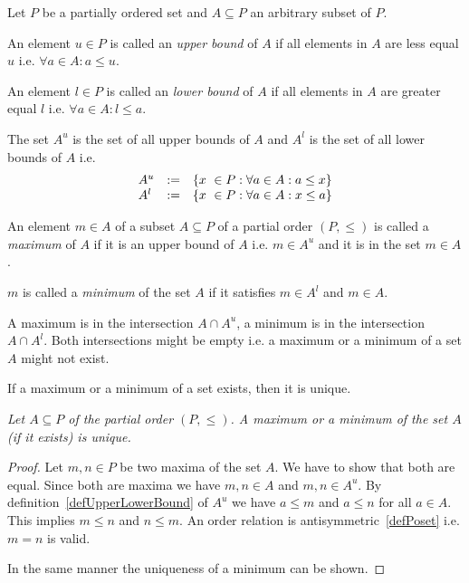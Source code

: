 \begin{definition}
    \label{defUpperLowerBound}

    Let $P$ be a partially ordered set and $A \subseteq P$ an arbitrary subset
    of $P$.

    An element $u \in P$ is called an \emph{upper bound} of $A$ if all elements
    in $A$ are less equal $u$ i.e. $\forall a\in A: a \le u$.

    An element $l \in P$ is called an \emph{lower bound} of $A$ if all elements
    in $A$ are greater equal $l$ i.e. $\forall a\in A: l \le a$.

    The set $A^u$ is the set of all upper bounds of $A$ and $A^l$ is the set of
    all lower bounds of $A$ i.e.
    $$
    \vertlist{
        A^u &:=& \set{x \in P: \forall a \in A: a \le x}
        \\
        A^l &:=& \set{x \in P: \forall a \in A: x \le a}
    }
    $$
\end{definition}



\begin{definition}
    \label{defMaximumMinimum}

    An element $m \in A$ of a subset $A \subseteq P$ of a partial order $(P,
    \le)$ is called a \emph{maximum} of $A$ if it is an upper bound of $A$ i.e.
    $m \in A^u$ and it is in the set $m \in A$.

    $m$ is called a \emph{minimum} of the set $A$ if it satisfies $m \in A^l$
    and $m \in A$.
\end{definition}

A maximum is in the intersection $A \cap A^u$, a minimum is in the intersection
$A \cap A^l$. Both intersections might be empty i.e. a maximum or a minimum of a
set $A$ might not exist.

If a maximum or a minimum of a set exists, then it is unique.

\begin{theorem}
    \label{thmMaximumMinimumUnique}
    \emph{Let $A \subseteq P$ of the partial order $(P, \le)$. A maximum or a
    minimum of the set $A$ (if it exists) is unique.
    }

    \begin{proof}
        Let $m, n \in P$ be two maxima of the set $A$. We have to show that both
        are equal. Since both are maxima we have $m, n \in A$ and $m,n \in A^u$.
        By definition~\ref{defUpperLowerBound} of $A^u$ we have $a \le m$ and $a
        \le n$ for all $a \in A$. This implies $m \le n$ and $n \le m$. An order
        relation is antisymmetric~\ref{defPoset} i.e. $m = n$ is valid.

        In the same manner the uniqueness of a minimum can be shown.
    \end{proof}
\end{theorem}


